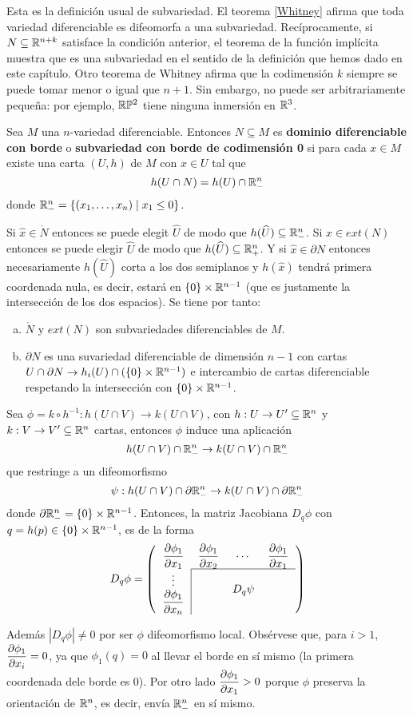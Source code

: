\documentclass[CV.tex]{subfiles}
\begin{document}
Esta es la definición usual de subvariedad. El teorema \ref{Whitney} afirma que toda variedad diferenciable es difeomorfa a una subvariedad. Recíprocamente, si $N\subseteq\mathbb{R}^{n+k}$ satisface la condición anterior, el teorema de la función implícita muestra que es una subvariedad en el sentido de la definición que hemos dado en este capítulo. Otro teorema de Whitney afirma que la codimensión $k$ siempre se puede tomar menor o igual que $n+1$. Sin embargo, no puede ser arbitrariamente pequeña: por ejemplo, $\mathbb{R}\mathbb{P}^2$ tiene ninguna inmersión en $\mathbb{R}^3$. 

\begin{defi}
Sea $M$ una $n$-variedad diferenciable. Entonces $N\subseteq M$ es \textbf{dominio diferenciable con borde} o \textbf{subvariedad con borde de codimensión 0} si para cada $x\in M$ existe una carta $(U,h)$ de $M$ con $x\in U$ tal que 
\[
h(U\cap N)=h(U)\cap\mathbb{R}^n_-
\]
donde $\mathbb{R}^n_-=\{(x_1,\dots, x_n)\mid x_1\leq 0\}$. 
\end{defi}

Si $\hat{x}\in \mathring{N}$ entonces se puede elegit $\widehat{U}$ de modo que $h(\widehat{U})\subseteq\mathbb{R}^n_-$. Si $\hat{x}\in ext(N)$ entonces se puede elegir $\widehat{U}$ de modo que $h(\widehat{U})\subseteq\mathbb{R}^n_+$. Y si $\hat{x}\in\partial N$ entonces necesariamente $h(\widehat{U})$ corta a los dos semiplanos y $h(\hat{x})$ tendrá primera coordenada nula, es decir, estará en $\{0\}\times \mathbb{R}^{n-1}$ (que es justamente la intersección de los dos espacios). Se tiene por tanto:
\begin{enumerate}[a)]
\item $\mathring{N}$ y $ext(N)$ son subvariedades diferenciables de $M$.
\item $\partial N$ es una suvariedad diferenciable de dimensión $n-1$ con cartas $U\cap \partial N\to h_i(U)\cap (\{0\}\times\mathbb{R}^{n-1})$ e intercambio de cartas diferenciable respetando la intersección con $\{0\}\times\mathbb{R}^{n-1}$. 
\end{enumerate}
Sea $\phi=k\circ h^{-1}:h(U\cap V)\to k(U\cap V)$, con $h:U\to U'\subseteq\mathbb{R}^n$ y $k:V\to V'\subseteq\mathbb{R}^n$ cartas, entonces $\phi$ induce una aplicación 
\[
h(U\cap V)\cap\mathbb{R}^n_-\to k(U\cap V)\cap\mathbb{R}^n_-
\]
que restringe a un difeomorfismo
\[
\psi:h(U\cap V)\cap\partial\mathbb{R}^n_-\to k(U\cap V)\cap\partial\mathbb{R}^n_-
\]
donde $\partial\mathbb{R}^n_-=\{0\}\times\mathbb{R}^{n-1}$. Entonces, la matriz Jacobiana $D_q\phi$ con $q=h(p)\in\{0\}\times\mathbb{R}^{n-1}$, es de la forma
\[
D_q\phi=\left(
\begin{tabular}{cccc}
$\dparcial{\phi_1}{x_1}$ & $\dparcial{\phi_1}{x_2}$ & $\cdots$ & $\dparcial{\phi_1}{x_1}$\\\cline{2-4}
\multicolumn{1}{c|}{$\vdots$}  & &\multirow{2}{*}{$D_q\psi$} & \\
\multicolumn{1}{c|}{$\dparcial{\phi_1}{x_n}$} & & & 
\end{tabular}
 \right)
\]

Además $|D_q\phi|\neq 0$ por ser $\phi$ difeomorfismo local. Obsérvese que, para $i>1$, $\dfrac{\partial \phi_1}{\partial x_i}=0$, ya que $\phi_1(q)=0$ al llevar el borde en sí mismo (la primera coordenada dele borde es 0). Por otro lado  $\dfrac{\partial \phi_1}{\partial x_1}>0$ porque $\phi$ preserva la orientación de $\mathbb{R}^n$, es decir, envía $\mathbb{R}^n_-$ en sí mismo. 
\end{document}
